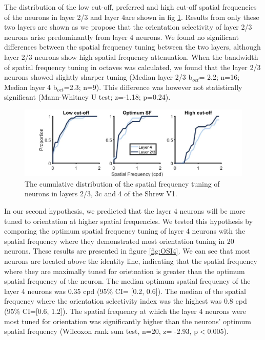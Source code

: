 The distribution of the low cut-off, preferred and high cut-off spatial frequencies of the neurons in layer 2/3 and layer 4are shown in fig \ref{fig:sftuning}. Results from only these two layers are shown as we propose that the orientation selectivity of layer 2/3 neurons arise predominantly from layer 4 neurons. We found no significant differences between the spatial frequency tuning between the two layers, although layer 2/3 neurons show high spatial frequency attenuation. When the bandwidth of spatial frequency tuning in octaves was calculated, we found that the layer 2/3 neurons showed slightly sharper tuning (Median layer 2/3 b$_{oct}$= 2.2; n=16; Median layer 4 b$_{oct}$=2.3; n=9). This difference was however not statistically significant (Mann-Whitney U test; z=-1.18; p=0.24).

		\begin{figure}[H]
		
		\includegraphics[width=\linewidth]{ShrewV1/sftuning_neurons_2.jpg}
		\caption{The cumulative distribution of the spatial frequency tuning of neurons in layers 2/3, 3c and 4 of the Shrew V1.}
		\label{fig:sftuning}
	\end{figure}

In our second hypothesis, we predicted that the layer 4 neurons will be more tuned to orientation at higher spatial frequencies. We tested this hypothesis by comparing the optimum spatial frequency tuning of layer 4 neurons with the spatial frequency where they demonstrated most orientation tuning in 20 neurons. These results are presented in figure \ref{fig:OSI4}. We can see that most neurons are located above the identity line, indicating that the spatial frequency where they are maximally tuned for orietnation is greater than the optimum spatial frequency of the neuron. The median optimum spatial frequency of the layer 4 neurons was 0.35 cpd (95\% CI= [0.2, 0.6]). The median of the spatial frequency where the orientation selectivity index was the highest was 0.8 cpd (95\% CI=[0.6, 1.2]). The spatial frequency at which the layer 4 neurons were most tuned for orientation was significantly higher than the neurons' optimum spatial frequency (Wilcoxon rank sum test, n=20, z= -2.93, p$<$0.005).


